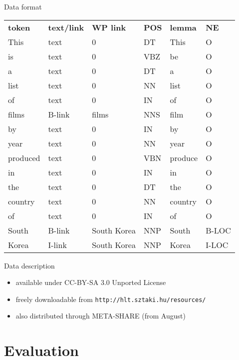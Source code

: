 \documentclass[utf8x,t]{beamer}
\begin{document}
\begin{frame}{Data format}

\begin{tabular}{llllll}
\textbf{token} & \textbf{text/link} & \textbf{WP link} & \textbf{POS} & \textbf{lemma} & \textbf{NE} \\
This & text & 0 &    DT &   This & O \\
is &   text & 0 &    VBZ &  be &   O \\
a &    text & 0 &    DT &   a  &    O\\
list & text & 0 &    NN &   list  & O\\
of &   text & 0 &    IN &   of &     O\\
films  & B-link & films &  NNS &  film & O\\
by &   text & 0 &    IN &   by &     O\\
year & text & 0 &    NN &   year & O\\
produced & text & 0 &    VBN &  produce & O\\
in &   text & 0 &    IN &   in &     O\\
the &  text & 0 &    DT &   the &   O\\
country &text & 0 &    NN &   country &O\\
of &   text & 0 &    IN &   of &     O\\
South &  B-link & South Korea &  NNP &  South  &B-LOC\\
Korea &  I-link & South Korea &  NNP &  Korea   & I-LOC\\
\end{tabular}

\end{frame}

\begin{frame}{Data description}

\begin{itemize}
\item available under CC-BY-SA 3.0 Unported License
\item freely downloadable from {\tt http://hlt.sztaki.hu/resources/} 
\item also distributed through META-SHARE (from August)
\end{itemize}

\end{frame}

\section{Evaluation}
\end{document}
